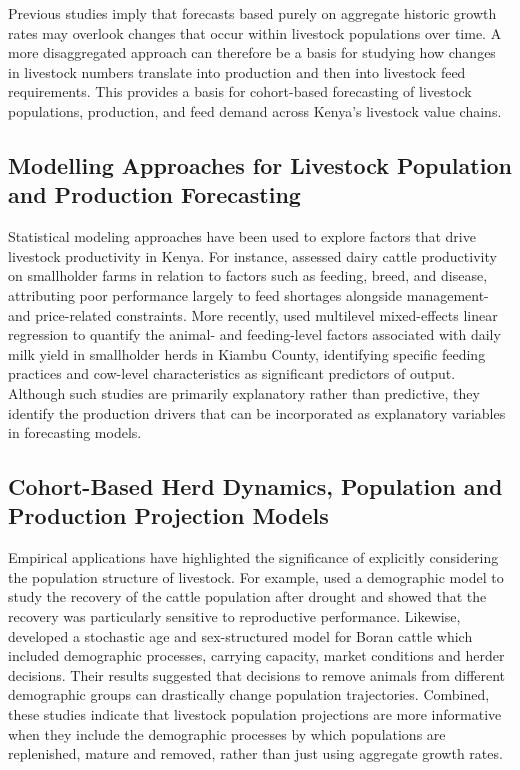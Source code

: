Previous studies imply that forecasts based purely on aggregate historic growth rates may overlook changes that occur within livestock populations over time. A more disaggregated approach can therefore be a basis for studying how changes in livestock numbers translate into production and then into livestock feed requirements. This provides a basis for cohort-based forecasting of livestock populations, production, and feed demand across Kenya's livestock value chains.

\subsection{Modelling Approaches for Livestock Population and Production Forecasting}

Statistical modeling approaches have been used to explore factors that drive livestock productivity in Kenya. For instance, \citet{ajak2020} assessed dairy cattle productivity on smallholder farms in relation to factors such as feeding, breed, and disease, attributing poor performance largely to feed shortages alongside management- and price-related constraints. More recently, \citet{were2025} used multilevel mixed-effects linear regression to quantify the animal- and feeding-level factors associated with daily milk yield in smallholder herds in Kiambu County, identifying specific feeding practices and cow-level characteristics as significant predictors of output. Although such studies are primarily explanatory rather than predictive, they identify the production drivers that can be incorporated as explanatory variables in forecasting models.

\subsection{Cohort-Based Herd Dynamics, Population and Production Projection Models}

Empirical applications have highlighted the significance of explicitly considering the population structure of livestock. For example, \citet{lesnoff2012} used a demographic model to study the recovery of the cattle population after drought and showed that the recovery was particularly sensitive to reproductive performance. Likewise, \citet{tuffa2017} developed a stochastic age and sex-structured model for Boran cattle which included demographic processes, carrying capacity, market conditions and herder decisions. Their results suggested that decisions to remove animals from different demographic groups can drastically change population trajectories. Combined, these studies indicate that livestock population projections are more informative when they include the demographic processes by which populations are replenished, mature and removed, rather than just using aggregate growth rates. 


